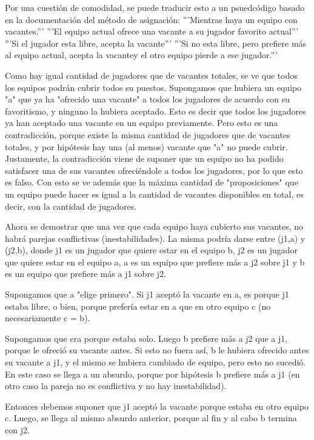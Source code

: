 \documentclass[titlepage,a4paper]{article}
\begin{document}
Por una cuestión de comodidad, se puede traducir esto a un psuedcódigo basado en la documentación del método de asignación:
'''Mientras haya un equipo con vacantes.'''
    '''El equipo actual ofrece una vacante a su jugador favorito actual'''
        '''Si el jugador esta libre, acepta la vacante'''
              '''Si no esta libre, pero prefiere más al equipo actual, acepta la vacantey el otro equipo pierde a ese jugador.'''

Como hay igual cantidad de jugadores que de vacantes totales, se ve que todos los equipos podrán cubrir todos su puestos. Supongamos que hubiera un equipo "a" que ya ha "ofrecido una vacante" a todos los jugadores de acuerdo con su favoritismo, y ninguno la hubiera aceptado. Esto es decir que todos los jugadores ya han aceptado una vacante en un equipo previamente. Pero esto es una contradicción, porque existe la misma cantidad de jugadores que de vacantes totales, y por hipótesis hay una (al menos) vacante que "a" no puede cubrir. Justamente, la contradicción viene de suponer que un equipo no ha podido satisfacer una de sus vacantes ofreciéndole a todos los jugadores, por lo que esto es falso. Con esto se ve además que la máxima cantidad de "proposiciones" que un equipo puede hacer es igual a la cantidad de vacantes disponibles en total, es decir, con la cantidad de jugadores.

Ahora se demostrar que una vez que cada equipo haya cubierto sus vacantes, no habrá parejas conflictivas (inestabilidades). La misma podría darse entre (j1,a) y (j2,b), donde j1 es un jugador que quiere estar en el equipo b, j2 es un jugador que quiere estar en el equipo a, a es un equipo que prefiere más a j2 sobre j1 y b es un equipo que prefiere más a j1 sobre j2.

Supongamos que a "elige primero". Si j1 aceptó la vacante en a, es porque j1 estaba libre, o bien, porque prefería estar en a que en otro equipo c (no necesariamente c = b).     

Supongamos que era porque estaba solo. Luego b prefiere más a j2 que a j1, porque le ofreció su vacante antes. Si esto no fuera así, b le hubiera ofrecido antes su vacante a j1, y el mismo se hubiera cambiado de equipo, pero esto no sucedió. En este caso se llega a un absurdo, porque por hipótesis b prefiere más a j1 (en otro caso la pareja no es conflictiva y no hay inestabilidad).

Entonces debemos suponer que j1 aceptó la vacante porque estaba en otro equipo c. Luego, se llega al mismo absurdo anterior, porque al fin y al cabo b termina con j2.
\end{document}
